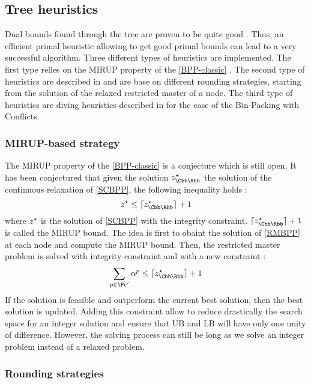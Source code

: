 \subsection{Tree heuristics}
\label{heuristic-tree}

Dual bounds found through the tree are proven to be quite good \cite{sadykov2013bin}. Thus, an efficient primal heuristic allowing to get good primal bounds can lead to a very successful algorithm. Three different types of heuristics are implemented. The first type relies on the MIRUP property of the \eqref{BPP-classic} \cite{delorme2016bin}. The second type of heuristics are described in \cite{wascher1996heuristics} and are base on different rounding strategies, starting from the solution of the relaxed restricted master of a node. The third type of heuristics are diving heuristics described in \cite{sadykov2013bin} for the case of the Bin-Packing with Conflicts. 

\subsubsection{MIRUP-based strategy}

The MIRUP property of the \eqref{BPP-classic} is a conjecture which is still open. It has been conjectured \cite{scheithauer1995modified} that given the solution $\opt{z}_{\Cbb\Rbb}$ the solution of the continuous relaxation of \eqref{SCBPP}, the following inequality holds :
\begin{equation}
	\label{mirup}
	\opt{z} \leq \ceil{\opt{z}_{\Cbb\Rbb}} + 1
\end{equation}
where ${z}^{\star}$ is the solution of \eqref{SCBPP} with the integrity constraint. $\ceil{\opt{z}_{\Cbb\Rbb}} + 1$ is called the MIRUP bound. The idea is first to obaint the solution of \eqref{RMBPP} at each node and compute the MIRUP bound. Then, the restricted master problem is solved with integrity constraint and with a new constraint :
\begin{equation*}
	\sum_{p \in \Pc'} \alpha^p \leq \ceil{\opt{z}_{\Cbb\Rbb}} + 1
\end{equation*}
If the solution is feasible and outperform the current best solution, then the best solution is updated. Adding this constraint allow to reduce drastically the search space for an integer solution and ensure that UB and LB will have only one unity of difference. However, the solving process can still be long as we solve an integer problem instead of a relaxed problem.


\subsubsection{Rounding strategies}

